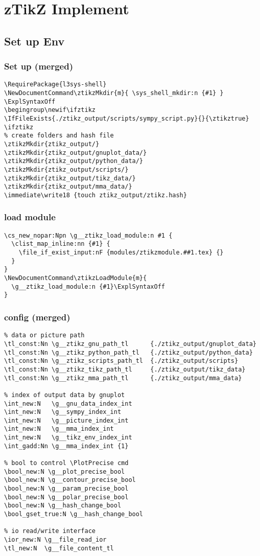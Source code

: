 \chapter{zTikZ Implement}
\section{Set up Env}
\subsection{Set up (merged)}
\begin{verbatim}
\RequirePackage{l3sys-shell}
\NewDocumentCommand\ztikzMkdir{m}{ \sys_shell_mkdir:n {#1} }
\ExplSyntaxOff
\begingroup\newif\ifztikz
\IfFileExists{./ztikz_output/scripts/sympy_script.py}{}{\ztikztrue}
\ifztikz
% create folders and hash file
\ztikzMkdir{ztikz_output/}
\ztikzMkdir{ztikz_output/gnuplot_data/}
\ztikzMkdir{ztikz_output/python_data/}
\ztikzMkdir{ztikz_output/scripts/}
\ztikzMkdir{ztikz_output/tikz_data/}
\ztikzMkdir{ztikz_output/mma_data/}
\immediate\write18 {touch ztikz_output/ztikz.hash}
\end{verbatim}

\subsection{load module}
\begin{verbatim}
\cs_new_nopar:Npn \g__ztikz_load_module:n #1 {
  \clist_map_inline:nn {#1} {
    \file_if_exist_input:nF {modules/ztikzmodule.##1.tex} {}
  }
}
\NewDocumentCommand\ztikzLoadModule{m}{
  \g__ztikz_load_module:n {#1}\ExplSyntaxOff
}
\end{verbatim}


\subsection{config (merged)}
\begin{verbatim}
% data or picture path
\tl_const:Nn \g__ztikz_gnu_path_tl      {./ztikz_output/gnuplot_data} 
\tl_const:Nn \g__ztikz_python_path_tl   {./ztikz_output/python_data} 
\tl_const:Nn \g__ztikz_scripts_path_tl  {./ztikz_output/scripts}
\tl_const:Nn \g__ztikz_tikz_path_tl     {./ztikz_output/tikz_data}
\tl_const:Nn \g__ztikz_mma_path_tl      {./ztikz_output/mma_data}

% index of output data by gnuplot
\int_new:N   \g__gnu_data_index_int
\int_new:N   \g__sympy_index_int
\int_new:N   \g__picture_index_int
\int_new:N   \g__mma_index_int
\int_new:N   \g__tikz_env_index_int
\int_gadd:Nn \g__mma_index_int {1}

% bool to control \PlotPrecise cmd
\bool_new:N \g__plot_precise_bool
\bool_new:N \g__contour_precise_bool
\bool_new:N \g__param_precise_bool
\bool_new:N \g__polar_precise_bool
\bool_new:N \g__hash_change_bool
\bool_gset_true:N \g__hash_change_bool

% io read/write interface
\ior_new:N \g__file_read_ior
\tl_new:N  \g__file_content_tl
\end{verbatim}


